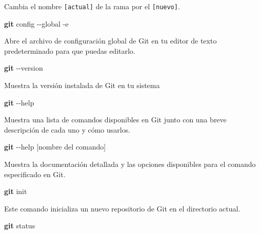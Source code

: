 \documentclass[
]{book}
\newenvironment{Shaded}{\begin{snugshade}}{\end{snugshade}}
\newcommand{\AttributeTok}[1]{\textcolor[rgb]{0.13,0.29,0.53}{#1}}
\newcommand{\FunctionTok}[1]{\textcolor[rgb]{0.13,0.29,0.53}{\textbf{#1}}}
\newcommand{\NormalTok}[1]{#1}
\begin{document}
Cambia el nombre \texttt{{[}actual{]}} de la rama por el \texttt{{[}nuevo{]}}.

\begin{Shaded}
\begin{Highlighting}[]
\FunctionTok{git}\NormalTok{ config }\AttributeTok{{-}{-}global} \AttributeTok{{-}e}
\end{Highlighting}
\end{Shaded}

Abre el archivo de configuración global de Git en tu editor de texto predeterminado para que puedas editarlo.

\begin{Shaded}
\begin{Highlighting}[]
\FunctionTok{git} \AttributeTok{{-}{-}version}
\end{Highlighting}
\end{Shaded}

Muestra la versión instalada de Git en tu sistema

\begin{Shaded}
\begin{Highlighting}[]
\FunctionTok{git} \AttributeTok{{-}{-}help}
\end{Highlighting}
\end{Shaded}

Muestra una lista de comandos disponibles en Git junto con una breve descripción de cada uno y cómo usarlos.

\begin{Shaded}
\begin{Highlighting}[]
\FunctionTok{git} \AttributeTok{{-}{-}help}\NormalTok{ [nombre del comando]}
\end{Highlighting}
\end{Shaded}

Muestra la documentación detallada y las opciones disponibles para el comando especificado en Git.

\begin{Shaded}
\begin{Highlighting}[]
\FunctionTok{git}\NormalTok{ init}
\end{Highlighting}
\end{Shaded}

Este comando inicializa un nuevo repositorio de Git en el directorio actual.

\begin{Shaded}
\begin{Highlighting}[]
\FunctionTok{git}\NormalTok{ status}
\end{Highlighting}
\end{Shaded}
\end{document}
